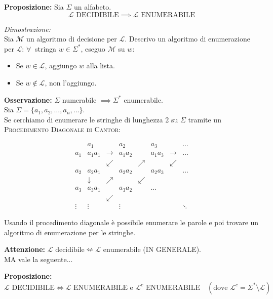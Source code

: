 \vspace{0.4cm}
\textbf{Proposizione:} Sia $\Sigma$ un alfabeto.
$$\mathcal{L} \text{ DECIDIBILE} \implies \mathcal{L} \text{ ENUMERABILE}$$

\textit{Dimostrazione:} \\
Sia $\mathcal{M}$ un algoritmo di decisione per $\mathcal{L}$. Descrivo un algoritmo di enumerazione per $\mathcal{L}$:
$\forall\ $ stringa $w \in \Sigma^*$, eseguo $\mathcal{M}$ su $w$:
\begin{itemize}
    \item Se $w \in \mathcal{L}$, aggiungo $w$ alla lista.
    \item Se $w \notin \mathcal{L}$, non l'aggiungo.
\end{itemize}

\vspace{0.4cm}
\textbf{Osservazione:} $\Sigma$ numerabile $\implies \Sigma^*$ enumerabile. \\
Sia $\Sigma = \{a_1, a_2, \dots, a_n, \dots\}$. \\
Se cerchiamo di enumerare le stringhe di lunghezza 2 su $\Sigma$ tramite un \textsc{Procedimento Diagonale di Cantor}:

$$\renewcommand{\arraystretch}{1.2}
\begin{array}{c|ccccccc}
 & a_1 & & a_2 & & a_3 & & \dots \\
\hline
a_1 & a_1 a_1 & \rightarrow & a_1 a_2 & & a_1 a_3 & \rightarrow & \dots \\
 & & \swarrow & & \nearrow & & \swarrow & \\
a_2 & a_2 a_1 & & a_2 a_2 & & a_2 a_3 & & \dots \\
 & \downarrow & \nearrow & & \swarrow & & & \\
a_3 & a_3 a_1 & & a_3 a_2 & & \dots & & \\
 & & \swarrow & & & & & \\
\vdots & \vdots & & \vdots & & & & \ddots
\end{array}$$


Usando il procedimento diagonale è possibile enumerare le parole e poi trovare un algoritmo di enumerazione per le stringhe.

\vspace{0.4cm}
\textbf{Attenzione:} $\mathcal{L} \text{ decidibile} \nLeftarrow \mathcal{L} \text{ enumerabile}$ (IN GENERALE). \\
MA vale la seguente...

\vspace{0.4cm}
\textbf{Proposizione:} 
$$\mathcal{L} \text{ DECIDIBILE} \iff \mathcal{L} \text{ ENUMERABILE e } \mathcal{L}^c \text{ ENUMERABILE} \quad (\text{dove } \mathcal{L}^c = \Sigma^* \setminus \mathcal{L})$$

